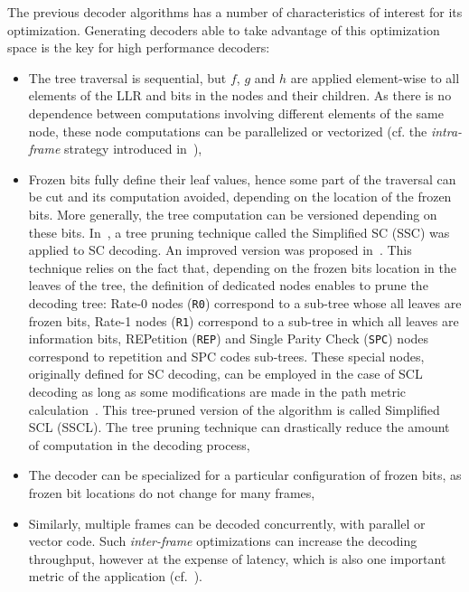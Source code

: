 The previous decoder algorithms has a number of characteristics of interest for
its optimization. Generating decoders able to take advantage of this
optimization space is the key for high performance decoders:
\begin{itemize}
  \item The tree traversal is sequential, but $f$, $g$ and $h$ are applied
    element-wise to all elements of the LLR and bits in the nodes and
    their children. As there is no dependence between computations
    involving different elements of the same node, these node computations
    can be parallelized or vectorized (cf. the \emph{intra-frame} strategy
    introduced in~\cite{Giard2014}),
  \item Frozen bits fully define their leaf values, hence some part of the
    traversal can be cut and its computation avoided, depending on the
    location of the frozen bits. More generally, the tree computation can
    be versioned depending on these bits. In~\cite{Alamdar-Yazdi2011}, a tree
    pruning technique called the Simplified SC (SSC) was applied to SC decoding.
    An improved version was proposed in~\cite{Sarkis2014a}. This technique
    relies on the fact that, depending on the frozen bits location in the leaves
    of the tree, the definition of dedicated nodes enables to prune the decoding
    tree: Rate-0 nodes (\texttt{R0}) correspond to a sub-tree whose all leaves
    are frozen bits, Rate-1 nodes (\texttt{R1}) correspond to a sub-tree in
    which all leaves are information bits, REPetition (\texttt{REP}) and Single
    Parity Check (\texttt{SPC}) nodes correspond to repetition and SPC codes
    sub-trees. These special nodes, originally defined for SC decoding, can be
    employed in the case of SCL decoding as long as some modifications are made
    in the path metric calculation~\cite{Sarkis2016}. This tree-pruned version
    of the algorithm is called Simplified SCL (SSCL). The tree pruning technique
    can drastically reduce the amount of computation in the decoding process,
  \item The decoder can be specialized for a particular configuration of frozen
    bits, as frozen bit locations do not change for many frames,
  \item Similarly, multiple frames can be decoded concurrently, with parallel or
    vector code. Such \emph{inter-frame} optimizations can increase the decoding
    throughput, however at the expense of latency, which is also one important
    metric of the application (cf.~\cite{LeGal2015a}).
\end{itemize}


